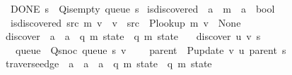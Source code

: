 \begin{isabellebody}
\ \ {\isachardoublequoteopen}DONE\ s\ {\isasymlongleftrightarrow}\ Q{\isacharunderscore}{\kern0pt}is{\isacharunderscore}{\kern0pt}empty\ {\isacharparenleft}{\kern0pt}queue\ s{\isacharparenright}{\kern0pt}{\isachardoublequoteclose}\isanewline
\isanewline
{}\isamarkupfalse%
\ is{\isacharunderscore}{\kern0pt}discovered\ {\isacharcolon}{\kern0pt}{\isacharcolon}{\kern0pt}\ {\isachardoublequoteopen}{\isacharprime}{\kern0pt}a\ {\isasymRightarrow}\ {\isacharprime}{\kern0pt}m\ {\isasymRightarrow}\ {\isacharprime}{\kern0pt}a\ {\isasymRightarrow}\ bool{\isachardoublequoteclose}\ \isanewline
\ \ {\isachardoublequoteopen}is{\isacharunderscore}{\kern0pt}discovered\ src\ m\ v\ {\isasymlongleftrightarrow}\ v\ {\isacharequal}{\kern0pt}\ src\ {\isasymor}\ P{\isacharunderscore}{\kern0pt}lookup\ m\ v\ {\isasymnoteq}\ None{\isachardoublequoteclose}\isanewline
\isanewline
{}\isamarkupfalse%
\ discover\ {\isacharcolon}{\kern0pt}{\isacharcolon}{\kern0pt}\ {\isachardoublequoteopen}{\isacharprime}{\kern0pt}a\ {\isasymRightarrow}\ {\isacharprime}{\kern0pt}a\ {\isasymRightarrow}\ {\isacharparenleft}{\kern0pt}{\isacharprime}{\kern0pt}q{\isacharcomma}{\kern0pt}\ {\isacharprime}{\kern0pt}m{\isacharparenright}{\kern0pt}\ state\ {\isasymRightarrow}\ {\isacharparenleft}{\kern0pt}{\isacharprime}{\kern0pt}q{\isacharcomma}{\kern0pt}\ {\isacharprime}{\kern0pt}m{\isacharparenright}{\kern0pt}\ state{\isachardoublequoteclose}\ \isanewline
\ \ {\isachardoublequoteopen}discover\ u\ v\ s\ {\isasymequiv}\isanewline
\ \ \ {\isasymlparr}queue\ {\isacharequal}{\kern0pt}\ Q{\isacharunderscore}{\kern0pt}snoc\ {\isacharparenleft}{\kern0pt}queue\ s{\isacharparenright}{\kern0pt}\ v{\isacharcomma}{\kern0pt}\isanewline
\ \ \ \ parent\ {\isacharequal}{\kern0pt}\ P{\isacharunderscore}{\kern0pt}update\ v\ u\ {\isacharparenleft}{\kern0pt}parent\ s{\isacharparenright}{\kern0pt}{\isasymrparr}{\isachardoublequoteclose}\isanewline
\isanewline
{}\isamarkupfalse%
\ traverse{\isacharunderscore}{\kern0pt}edge\ {\isacharcolon}{\kern0pt}{\isacharcolon}{\kern0pt}\ {\isachardoublequoteopen}{\isacharprime}{\kern0pt}a\ {\isasymRightarrow}\ {\isacharprime}{\kern0pt}a\ {\isasymRightarrow}\ {\isacharprime}{\kern0pt}a\ {\isasymRightarrow}\ {\isacharparenleft}{\kern0pt}{\isacharprime}{\kern0pt}q{\isacharcomma}{\kern0pt}\ {\isacharprime}{\kern0pt}m{\isacharparenright}{\kern0pt}\ state\ {\isasymRightarrow}\ {\isacharparenleft}{\kern0pt}{\isacharprime}{\kern0pt}q{\isacharcomma}{\kern0pt}\ {\isacharprime}{\kern0pt}m{\isacharparenright}{\kern0pt}\ state{\isachardoublequoteclose}\ \isanewline

\end{isabellebody}
